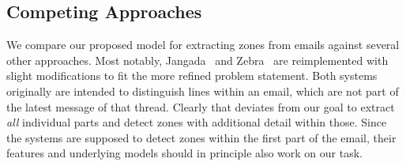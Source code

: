 \documentclass{llncs}
\begin{document}





\subsection{Competing Approaches}
We compare our proposed model for extracting zones from emails against several other approaches.
Most notably, Jangada~\cite{signature} and Zebra~\cite{zones} are reimplemented with slight modifications to fit the more refined problem statement.
Both systems originally are intended to distinguish lines within an email, which are not part of the latest message of that thread.
Clearly that deviates from our goal to extract \textit{all} individual parts and detect zones with additional detail within those.
Since the systems are supposed to detect zones within the first part of the email, their features and underlying models should in principle also work on our task.
\end{document}
